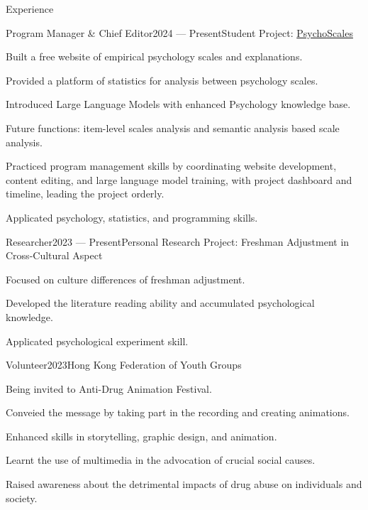 \documentclass[
	11pt, %
]{resume} %
\begin{document}
\begin{rSection}{Experience}

    \begin{rSubsection}{Program Manager \& Chief Editor}{2024  --- Present}{Student Project: \href{https://psygscales.com/}{PsychoScales}}{}
        \item Built a free website of empirical psychology scales and explanations.
        \item Provided a platform of statistics for analysis between psychology scales.
        \item Introduced Large Language Models with enhanced Psychology knowledge base.
        \item Future functions: item-level scales analysis and semantic analysis based scale analysis.
        \item Practiced program management skills by coordinating website development, content editing, and large language model training, with project dashboard and timeline, leading the project orderly.
        \item Applicated psychology, statistics, and programming skills.
    \end{rSubsection}

    \begin{rSubsection}{Researcher}{2023 --- Present}{Personal Research Project: Freshman Adjustment in Cross-Cultural Aspect}{}
        \item Focused on culture differences of freshman adjustment.
        \item Developed the literature reading ability and accumulated psychological knowledge.
        \item Applicated psychological experiment skill.
    \end{rSubsection}

    \begin{rSubsection}{Volunteer}{2023}{Hong Kong Federation of Youth Groups}{}
        \item Being invited to Anti-Drug Animation Festival.
        \item Conveied the message by taking part in the recording and creating animations.
        \item Enhanced skills in storytelling, graphic design, and animation.
        \item Learnt the use of multimedia in the advocation of crucial social causes.
        \item Raised awareness about the detrimental impacts of drug abuse on individuals and society.
    \end{rSubsection}


\end{rSection}
\end{document}
